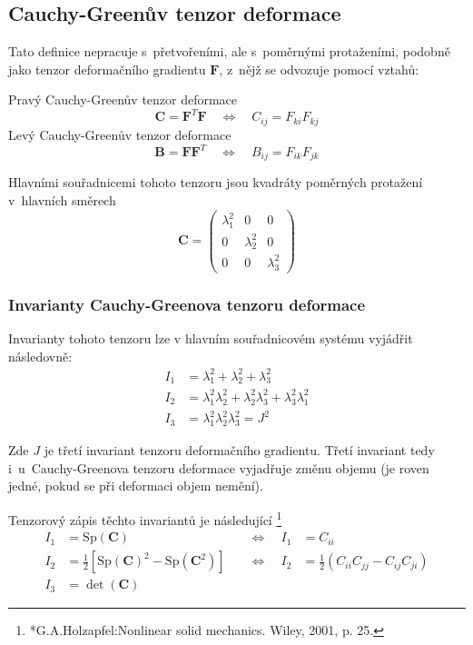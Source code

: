 
\subsection{Cauchy-Greenův tenzor deformace}
Tato definice nepracuje s~přetvořeními, ale s~poměrnými protaženími, podobně jako tenzor deformačního gradientu $\bm{F}$, z~nějž se odvozuje pomocí vztahů:

Pravý Cauchy-Greenův tenzor deformace
\begin{equation}
	\bm{C} = \bm{F}^T \bm{F}
	\quad\Leftrightarrow\quad
	C_{ij} = F_{ki} F_{kj}
\end{equation}
Levý Cauchy-Greenův tenzor deformace
\begin{equation}
	\bm{B} = \bm{F} \bm{F}^T
	\quad\Leftrightarrow\quad
	B_{ij} = F_{ik} F_{jk}
\end{equation}

Hlavními souřadnicemi tohoto tenzoru jsou kvadráty poměrných protažení v~hlavních směrech
\begin{equation}
	\bm{C} = \left(\begin{matrix}
		\lambda_1^2 & 0 & 0\\
		0 & \lambda_2^2 & 0\\
		0 & 0 & \lambda_3^2
	\end{matrix}\right)
\end{equation}

\subsubsection{Invarianty Cauchy-Greenova tenzoru deformace}
Invarianty tohoto tenzoru lze v hlavním souřadnicovém systému vyjádřit následovně:
\begin{align}
	I_1 &= \lambda_1^2 + \lambda_2^2 + \lambda_3^2\\
	I_2 &= \lambda_1^2 \lambda_2^2 + \lambda_2^2 \lambda_3^2 + \lambda_3^2 \lambda_1^2\\
	I_3 &= \lambda_1^2 \lambda_2^2 \lambda_3^2 = J^2
\end{align}

Zde $J$ je třetí invariant tenzoru deformačního gradientu. Třetí invariant tedy i~u~Cauchy-Greenova tenzoru deformace vyjadřuje změnu objemu (je roven jedné, pokud se při deformaci objem nemění).

Tenzorový zápis těchto invariantů je následující
\footnote{*G.A.Holzapfel:Nonlinear solid mechanics. Wiley, 2001, p. 25.}
\begin{align}
	I_1 &= \mathrm{Sp}(\bm{C})%
	&\quad\Leftrightarrow\quad
	I_1 &= C_{ii}\\
	I_2 &= \frac{1}{2} \left[\mathrm{Sp}(\bm{C})^2 - \mathrm{Sp}(\bm{C}^2)\right]
	&\quad\Leftrightarrow\quad
	I_2 &= \frac{1}{2} (C_{ii} C_{jj} - C_{ij} C_{ji})\\
	I_3 &= \det(\bm{C})
\end{align}

